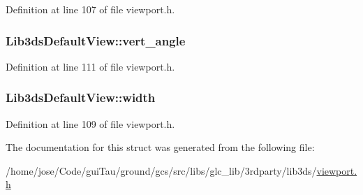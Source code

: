 Definition at line 107 of file viewport.\-h.

\hypertarget{struct_lib3ds_default_view_ae1ad24f01fc6c09fa04c2122802fa67d}{
\subsubsection[{vert\-\_\-angle}]{ Lib3ds\-Default\-View\-::vert\-\_\-angle}}\label{struct_lib3ds_default_view_ae1ad24f01fc6c09fa04c2122802fa67d}


Definition at line 111 of file viewport.\-h.

\hypertarget{struct_lib3ds_default_view_a2aeb68b068c4a4bea49d410fc1c0a73a}{
\subsubsection[{width}]{ Lib3ds\-Default\-View\-::width}}\label{struct_lib3ds_default_view_a2aeb68b068c4a4bea49d410fc1c0a73a}


Definition at line 109 of file viewport.\-h.



The documentation for this struct was generated from the following file\-:\begin{DoxyCompactItemize}
\item 
/home/jose/\-Code/gui\-Tau/ground/gcs/src/libs/glc\-\_\-lib/3rdparty/lib3ds/\hyperlink{viewport_8h}{viewport.\-h}\end{DoxyCompactItemize}
